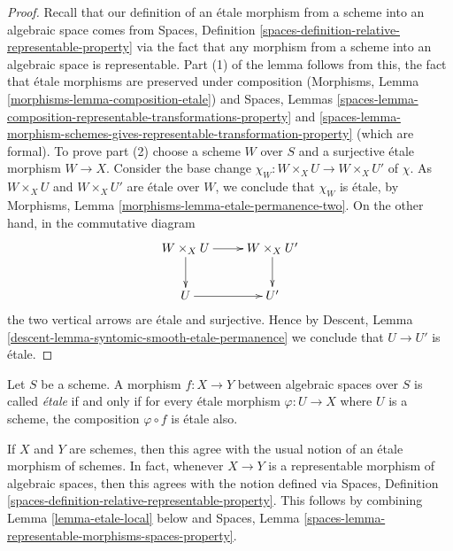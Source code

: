 \begin{proof}
Recall that our definition of an \'etale morphism from a scheme into an
algebraic space comes from
Spaces, Definition
\ref{spaces-definition-relative-representable-property}
via the fact that any morphism from a scheme into an algebraic space
is representable. Part (1) of the lemma follows from this, the fact that
\'etale morphisms are preserved under composition
(Morphisms, Lemma
\ref{morphisms-lemma-composition-etale})
and
Spaces, Lemmas
\ref{spaces-lemma-composition-representable-transformations-property} and
\ref{spaces-lemma-morphism-schemes-gives-representable-transformation-property}
(which are formal).
To prove part (2) choose a scheme $W$ over $S$ and a
surjective \'etale morphism $W \to X$. Consider the base change
$\chi_W : W \times_X U \to W \times_X U'$ of $\chi$.
As $W \times_X U$ and $W \times_X U'$ are \'etale over $W$, we conclude that
$\chi_W$ is \'etale, by
Morphisms, Lemma \ref{morphisms-lemma-etale-permanence-two}.
On the other hand, in the commutative diagram
$$
\xymatrix{
W \times_X U \ar[r] \ar[d] & W \times_X U' \ar[d] \\
U \ar[r] & U'
}
$$
the two vertical arrows are \'etale and surjective.
Hence by
Descent, Lemma \ref{descent-lemma-syntomic-smooth-etale-permanence}
we conclude that $U \to U'$ is \'etale.
\end{proof}

\begin{definition}
\label{definition-etale}
Let $S$ be a scheme.
A morphism $f : X \to Y$ between algebraic spaces over $S$ is
called {\it \'etale} if and only if for every \'etale morphism
$\varphi : U \to X$ where $U$ is a scheme, the composition
$\varphi \circ f$ is \'etale also.
\end{definition}

\noindent
If $X$ and $Y$ are schemes, then this agree with the usual notion of an
\'etale morphism of schemes. In fact, whenever $X \to Y$ is a representable
morphism of algebraic spaces, then this agrees with the notion defined via
Spaces, Definition \ref{spaces-definition-relative-representable-property}.
This follows by combining Lemma \ref{lemma-etale-local} below and
Spaces, Lemma \ref{spaces-lemma-representable-morphisms-spaces-property}.

